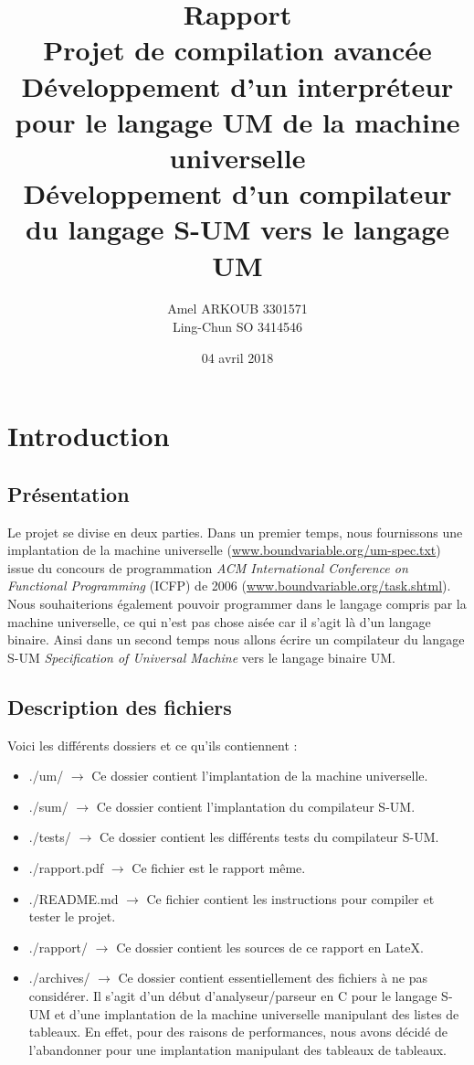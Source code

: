 \documentclass[a4paper,12pt]{report}
\title{\Huge Rapport \\ 
	Projet de compilation avancée \\
	\large Développement d'un interpréteur pour le langage UM de la machine universelle \\
	Développement d'un compilateur du langage S-UM vers le langage UM}
\author{Amel ARKOUB 3301571 \\ Ling-Chun SO 3414546}
\date{04 avril 2018}
\begin{document}
\maketitle

\tableofcontents
\newpage

\chapter{Introduction}
\section{Présentation}
Le projet se divise en deux parties. Dans un premier temps, nous fournissons une implantation de la machine universelle (\url{www.boundvariable.org/um-spec.txt})
issue du concours de programmation \textit{ACM International Conference on Functional Programming} (ICFP) de 2006 
(\url{www.boundvariable.org/task.shtml}).
Nous souhaiterions également pouvoir programmer dans le langage compris par la machine universelle, ce qui n'est pas chose aisée car il s'agit là d'un langage
binaire. Ainsi dans un second temps nous allons écrire un compilateur du langage S-UM 
\textit{Specification of Universal Machine} vers le langage binaire UM.

\section{Description des fichiers}
Voici les différents dossiers et ce qu'ils contiennent :
\begin{itemize}
 \item ./um/ $\rightarrow$ Ce dossier contient l'implantation de la machine universelle.
 \item ./sum/ $\rightarrow$ Ce dossier contient l'implantation du compilateur S-UM.
 \item ./tests/ $\rightarrow$ Ce dossier contient les différents tests du compilateur S-UM.
 \item ./rapport.pdf $\rightarrow$ Ce fichier est le rapport même.
 \item ./README.md $\rightarrow$ Ce fichier contient les instructions pour compiler et tester le projet.
 \item ./rapport/ $\rightarrow$ Ce dossier contient les sources de ce rapport en LateX.
 \item ./archives/ $\rightarrow$ Ce dossier contient essentiellement des fichiers à ne pas considérer. Il s'agit d'un début d'analyseur/parseur en C pour le langage S-UM et d'une implantation de la machine universelle manipulant des listes de tableaux. En effet, pour des raisons de performances, nous avons décidé de l'abandonner pour une implantation manipulant des tableaux de tableaux.
\end{itemize}
\end{document}
